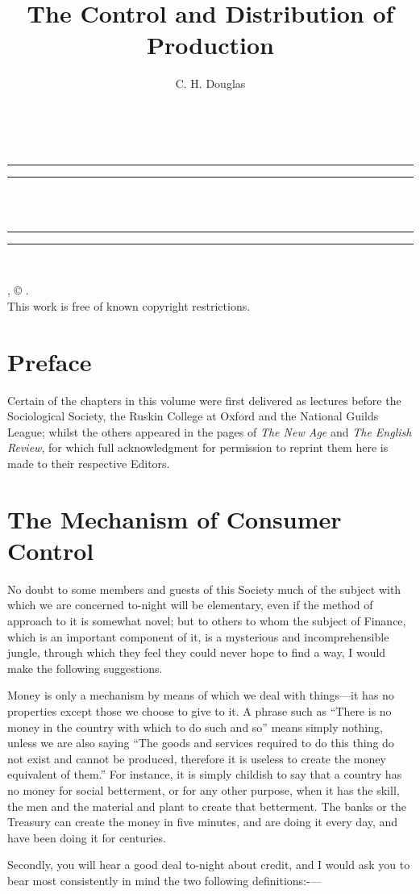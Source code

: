 \documentclass{book}
\date{}
\title{The Control and Distribution of Production}
\author{C. H. Douglas}
\makeatletter
\renewcommand{\maketitle}{
  \thispagestyle{empty}
  \vspace*{\stretch{1}}
  
  \begin{center}
    {\Huge \@title   \\[5mm]}
  \end{center}
  \vspace*{\stretch{2}}
  
  \newpage
  \thispagestyle{empty}
  \cleardoublepage

  \begin{center}  
    \thispagestyle{empty}
    \vspace*{\baselineskip}
    \rule{\textwidth}{1.6pt}\vspace*{-\baselineskip}\vspace*{2pt}
    \rule{\textwidth}{0.4pt}\\[\baselineskip]
    
    {\Huge\scshape \@title   \\[5mm]}
    {\Large }
    
    \rule{\textwidth}{0.4pt}\vspace*{-\baselineskip}\vspace{3.2pt}
    \rule{\textwidth}{1.6pt}\\[\baselineskip]

    \vspace*{4\baselineskip}

    {\Large \@author}
    \vfill
    
  \end{center}
  
  \pagebreak
  \newpage
  \thispagestyle{empty}
  \null\vfill
  \noindent
  \begin{center}
    {\emph{\@title}, © \@author.\\[5mm]}
    {This work is free of known copyright restrictions.\\[5mm]}
  \end{center}
  \pagebreak
  \newpage
}
\makeatother
\begin{document}



\maketitle

\setcounter{tocdepth}{0}
\setcounter{secnumdepth}{0}
\chapter*{Preface}
\label{chapter-0}
Certain of the chapters in this volume were first delivered as lectures before the Sociological Society, the Ruskin College at Oxford and the National Guilds League; whilst the others appeared in the pages of \emph{The New Age} and \emph{The English Review}, for which full acknowledgment for permission to reprint them here is made to their respective Editors.

\chapter{The Mechanism of Consumer Control}
\label{chapter-1}
No doubt to some members and guests of this Society much of the subject with which we are concerned to-night will be elementary, even if the method of approach to it is somewhat novel; but to others to whom the subject of Finance, which is an important component of it, is a mysterious and incomprehensible jungle, through which they feel they could never hope to find a way, I would make the following suggestions.

Money is only a mechanism by means of which we deal with things—it has no properties except those we choose to give to it. A phrase such as “There is no money in the country with which to do such and so” means simply nothing, unless we are also saying “The goods and services required to do this thing do not exist and cannot be produced, therefore it is useless to create the money equivalent of them.” For instance, it is simply childish to say that a country has no money for social betterment, or for any other purpose, when it has the skill, the men and the material and plant to create that betterment. The banks or the Treasury can create the money in five minutes, and are doing it every day, and have been doing it for centuries.

Secondly, you will hear a good deal to-night about credit, and I would ask you to bear most consistently in mind the two following definitions:-—
\end{document}
